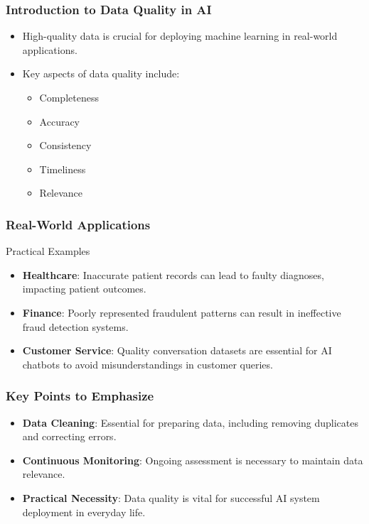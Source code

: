 \documentclass[aspectratio=169]{beamer}
\begin{document}
\begin{frame}[fragile]
    \frametitle{Introduction to Data Quality in AI}
    \begin{itemize}
        \item High-quality data is crucial for deploying machine learning in real-world applications.
        \item Key aspects of data quality include:
        \begin{itemize}
            \item Completeness
            \item Accuracy
            \item Consistency
            \item Timeliness
            \item Relevance
        \end{itemize}
    \end{itemize}
\end{frame}

\begin{frame}[fragile]
    \frametitle{Real-World Applications}
    \begin{block}{Practical Examples}
        \begin{itemize}
            \item \textbf{Healthcare}: Inaccurate patient records can lead to faulty diagnoses, impacting patient outcomes.
            \item \textbf{Finance}: Poorly represented fraudulent patterns can result in ineffective fraud detection systems.
            \item \textbf{Customer Service}: Quality conversation datasets are essential for AI chatbots to avoid misunderstandings in customer queries.
        \end{itemize}
    \end{block}
\end{frame}

\begin{frame}[fragile]
    \frametitle{Key Points to Emphasize}
    \begin{itemize}
        \item \textbf{Data Cleaning}: Essential for preparing data, including removing duplicates and correcting errors.
        \item \textbf{Continuous Monitoring}: Ongoing assessment is necessary to maintain data relevance.
        \item \textbf{Practical Necessity}: Data quality is vital for successful AI system deployment in everyday life.
    \end{itemize}
\end{frame}
\end{document}

